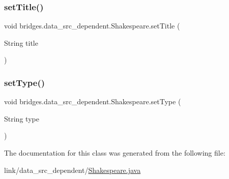 \hypertarget{classbridges_1_1data__src__dependent_1_1_shakespeare_a2687017aca35bb26b148f784a0bff732}{}\label{classbridges_1_1data__src__dependent_1_1_shakespeare_a2687017aca35bb26b148f784a0bff732} 
\subsubsection{\texorpdfstring{set\+Title()}{setTitle()}}
{\footnotesize\ttfamily void bridges.\+data\+\_\+src\+\_\+dependent.\+Shakespeare.\+set\+Title (\begin{DoxyParamCaption}\item[{String}]{title }\end{DoxyParamCaption})}

\hypertarget{classbridges_1_1data__src__dependent_1_1_shakespeare_afcee18014d5630a0a15701635005bea2}{}\label{classbridges_1_1data__src__dependent_1_1_shakespeare_afcee18014d5630a0a15701635005bea2} 
\subsubsection{\texorpdfstring{set\+Type()}{setType()}}
{\footnotesize\ttfamily void bridges.\+data\+\_\+src\+\_\+dependent.\+Shakespeare.\+set\+Type (\begin{DoxyParamCaption}\item[{String}]{type }\end{DoxyParamCaption})}



The documentation for this class was generated from the following file\+:\begin{DoxyCompactItemize}
\item 
link/data\+\_\+src\+\_\+dependent/\hyperlink{_shakespeare_8java}{Shakespeare.\+java}\end{DoxyCompactItemize}

